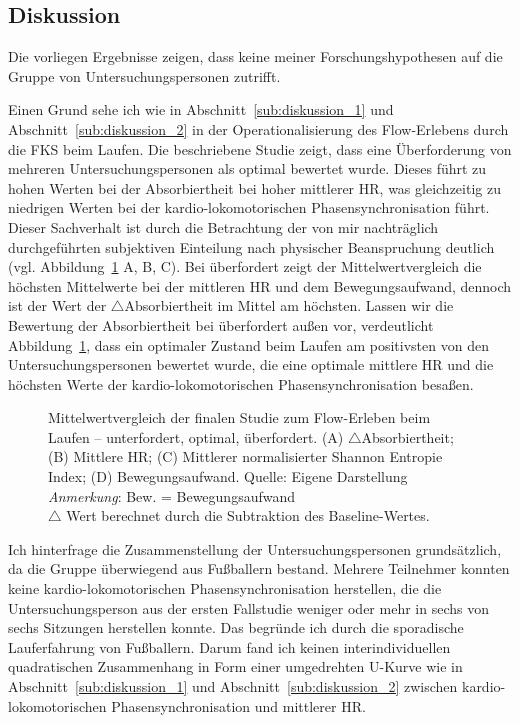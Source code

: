 

\subsection{Diskussion}
\label{sub:diskussion_3}
Die vorliegen Ergebnisse zeigen, dass keine meiner Forschungshypothesen auf die Gruppe von Untersuchungspersonen zutrifft. 

Einen Grund sehe ich wie in Abschnitt~\ref{sub:diskussion_1} und Abschnitt~\ref{sub:diskussion_2} in der Operationalisierung des Flow-Erlebens durch die \ac{FKS} beim Laufen. Die beschriebene Studie zeigt, dass eine Überforderung von mehreren Untersuchungspersonen als optimal bewertet wurde. Dieses führt zu hohen Werten bei der Absorbiertheit bei hoher mittlerer \ac{HR}, was gleichzeitig zu niedrigen Werten bei der kardio-lokomotorischen Phasensynchronisation führt. Dieser Sachverhalt ist durch die Betrachtung der von mir nachträglich durchgeführten subjektiven Einteilung nach physischer Beanspruchung deutlich (vgl. Abbildung~\ref{fig:5_20_mittelwert_vergleich} A, B, C). Bei überfordert zeigt der Mittelwertvergleich die höchsten Mittelwerte bei der mittleren \ac{HR} und dem Bewegungsaufwand, dennoch ist der Wert der $\bigtriangleup$Absorbiertheit im Mittel am höchsten. Lassen wir die Bewertung der Absorbiertheit bei überfordert außen vor, verdeutlicht Abbildung~\ref{fig:5_20_mittelwert_vergleich}, dass ein optimaler Zustand beim Laufen am positivsten von den Untersuchungspersonen bewertet wurde, die eine optimale mittlere \ac{HR} und die höchsten Werte der kardio-lokomotorischen Phasensynchronisation besaßen.

\begin{figure}
	
	\caption[Mittelwertvergleich (Studie: Laufen)]{Mittelwertvergleich der finalen Studie zum Flow-Erleben beim Laufen -- unterfordert, optimal, überfordert. (A) $\bigtriangleup$Absorbiertheit; (B) Mittlere HR; (C) Mittlerer normalisierter Shannon Entropie Index; (D) Bewegungsaufwand. Quelle: Eigene Darstellung \\ \hspace{\textwidth}\emph{Anmerkung}: Bew. = Bewegungsaufwand\\ \hspace{\textwidth}$\bigtriangleup$ Wert berechnet durch die Subtraktion des Baseline-Wertes.}
	\label{fig:5_20_mittelwert_vergleich}
\end{figure}

Ich hinterfrage die Zusammenstellung der Untersuchungspersonen grundsätzlich, da die Gruppe überwiegend aus Fußballern bestand. Mehrere Teilnehmer konnten keine kardio-lokomotorischen Phasensynchronisation herstellen, die die Untersuchungsperson aus der ersten Fallstudie weniger oder mehr in sechs von sechs Sitzungen herstellen konnte. Das begründe ich durch die sporadische Lauferfahrung von Fußballern. Darum fand ich keinen interindividuellen quadratischen Zusammenhang in Form einer umgedrehten U-Kurve wie in Abschnitt~\ref{sub:diskussion_1} und Abschnitt~\ref{sub:diskussion_2} zwischen kardio-lokomotorischen Phasensynchronisation und mittlerer \ac{HR}.

